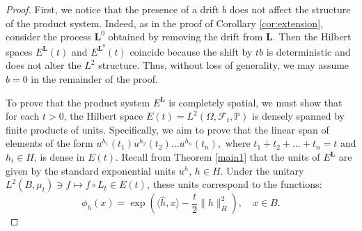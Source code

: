 \documentclass[10pt,a4paper]{amsart}
\begin{document}
\begin{proof} First, we notice that the presence of a drift \( b \) does not affect the structure of the product system. Indeed, as in the proof of Corollary \ref{cor:extension}, consider the process \( \bm{L}^0\) obtained by removing the drift from  \( \bm{L}\). Then the Hilbert spaces \( E^{\bm{L}}(t)\)  and \( E^{\bm{L}^0}(t)\)  coincide because the shift by \( t b \) is deterministic and does not alter the \( L^2 \) structure. Thus, without loss of generality, we may assume \( b = 0 \)  in the remainder of the proof.

To prove that the product system \( E^{\bm{L}} \) is completely spatial, we must show that for each \( t > 0 \), the Hilbert space \( E(t) = L^2(\Omega, \mathcal{F}_t, \mathbb{P}) \) is densely spanned by finite products of units. Specifically, we aim to prove that the linear span of elements of the form
\(
u^{h_1}(t_1) u^{h_2}(t_2) \dots u^{h_n}(t_n),
\)
where \( t_1 + t_2 + \dots + t_n = t \) and \( h_i \in H \), is dense in \( E(t) \).
Recall from Theorem \ref{main1} that the units of \( E^{\bm{L}} \) are given by the standard exponential units \(u^h\), \(h\in H\). Under the unitary \(
L^2(B, \mu_t)\ni f  \mapsto f \circ L_t\in E(t)\), these units correspond to the functions:
\[
\phi_h(x) = \exp\left( \langle \hat{h}, x \rangle - \frac{t}{2} \| h \|_H^2 \right), \quad x \in B.
\]


\end{proof}
\end{document}
